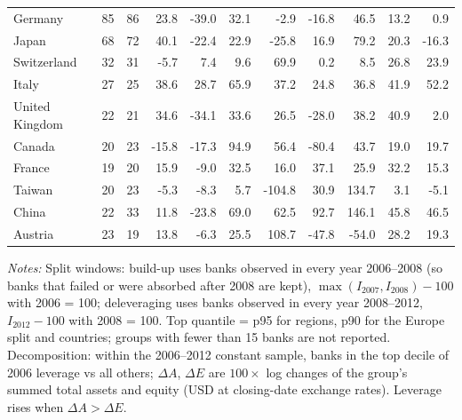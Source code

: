 \documentclass[11pt]{article}
\begin{document}
\begin{table}[htbp]
\begin{threeparttable}
\begin{tabular}{lrrrrrrrrrr}
Germany & 85 & 86 & 23.8 & -39.0 & 32.1 & -2.9 & -16.8 & 46.5 & 13.2 & 0.9 \\
Japan & 68 & 72 & 40.1 & -22.4 & 22.9 & -25.8 & 16.9 & 79.2 & 20.3 & -16.3 \\
Switzerland & 32 & 31 & -5.7 & 7.4 & 9.6 & 69.9 & 0.2 & 8.5 & 26.8 & 23.9 \\
Italy & 27 & 25 & 38.6 & 28.7 & 65.9 & 37.2 & 24.8 & 36.8 & 41.9 & 52.2 \\
United Kingdom & 22 & 21 & 34.6 & -34.1 & 33.6 & 26.5 & -28.0 & 38.2 & 40.9 & 2.0 \\
Canada & 20 & 23 & -15.8 & -17.3 & 94.9 & 56.4 & -80.4 & 43.7 & 19.0 & 19.7 \\
France & 19 & 20 & 15.9 & -9.0 & 32.5 & 16.0 & 37.1 & 25.9 & 32.2 & 15.3 \\
Taiwan & 20 & 23 & -5.3 & -8.3 & 5.7 & -104.8 & 30.9 & 134.7 & 3.1 & -5.1 \\
China & 22 & 33 & 11.8 & -23.8 & 69.0 & 62.5 & 92.7 & 146.1 & 45.8 & 46.5 \\
Austria & 23 & 19 & 13.8 & -6.3 & 25.5 & 108.7 & -47.8 & -54.0 & 28.2 & 19.3 \\
\bottomrule
\end{tabular}
\begin{tablenotes}[flushleft]
\footnotesize
\item \textit{Notes:} Split windows: build-up uses banks observed in every year 2006--2008 (so banks that failed or were absorbed after 2008 are kept), $\max(I_{2007}, I_{2008}) - 100$ with 2006 = 100; deleveraging uses banks observed in every year 2008--2012, $I_{2012} - 100$ with 2008 = 100. Top quantile = p95 for regions, p90 for the Europe split and countries; groups with fewer than 15 banks are not reported. Decomposition: within the 2006--2012 constant sample, banks in the top decile of 2006 leverage vs all others; $\Delta A$, $\Delta E$ are $100\times$ log changes of the group's summed total assets and equity (USD at closing-date exchange rates). Leverage rises when $\Delta A > \Delta E$.
\end{tablenotes}
\end{threeparttable}
\end{table}
\end{document}
